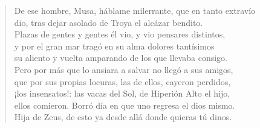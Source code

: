 \documentclass[11pt,a4paper]{article}
\begin{document}
\begin{verse}
De ese hombre, Musa, háblame milerrante, que en tanto extravío\\
dio, tras dejar asolado de Troya el alcázar bendito.\\
Plazas de gentes y gentes él vio, y vio pensares distintos,\\
y por el gran mar tragó en su alma dolores tantísimos\\
su aliento y vuelta amparando de los que llevaba consigo.\\
Pero por más que lo ansiara a salvar no llegó a sus amigos,\\
que por sus propias locuras, las de ellos, cayeron perdidos,\\
¡los insensatos!: las vacas del Sol, de Hiperión Alto el hijo,\\
ellos comieron. Borró día en que uno regresa el dios mismo.\\
Hija de Zeus, de esto ya desde allá donde quieras tú dinos.                     
\end{verse}



%
%
%
\end{document}
